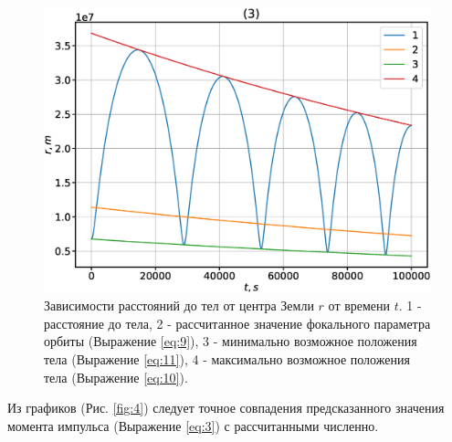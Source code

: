 \documentclass[12pt]{article}
\begin{document}
\begin{figure}[H]
    \endminipage\hfill
      \includegraphics[width=1.0\linewidth]{r_t_3.eps}
    \endminipage
    \caption{Зависимости расстояний до тел от центра Земли $r$ от времени $t$. 1 - расстояние до тела, 
    2 - рассчитанное значение фокального параметра орбиты (Выражение \ref{eq:9}), 3 - минимально возможное положения тела (Выражение \ref{eq:11}), 
    4 - максимально возможное положения тела (Выражение \ref{eq:10}).}
    \label{fig:3}
    \end{figure}
Из графиков (Рис. \ref{fig:4}) следует точное совпадения предсказанного значения момента импульса (Выражение \ref{eq:3})  с рассчитанными численно.
\end{document}
